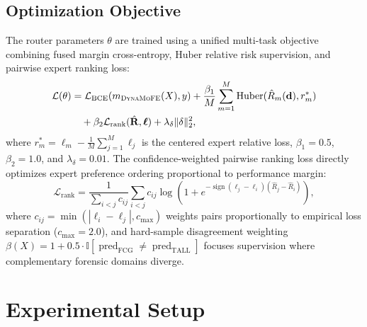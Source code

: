 \documentclass[conference]{IEEEtran}
\newcommand{\dynamofe}{\textsc{DynaMoFE}}
\begin{document}
\subsection{Optimization Objective}
The router parameters $\theta$ are trained using a unified multi-task objective combining fused margin cross-entropy, Huber relative risk supervision, and pairwise expert ranking loss:
\begin{align}
    \mathcal{L}(\theta) &= \mathcal{L}_{\text{BCE}}(m_{\dynamofe}(X), y) + \frac{\beta_1}{M}\sum_{m=1}^M \operatorname{Huber}(\hat{R}_m(\mathbf{d}), r_m^*) \nonumber \\
    &\quad + \beta_2 \mathcal{L}_{\text{rank}}(\hat{\mathbf{R}}, \boldsymbol{\ell}) + \lambda_\delta \|\delta\|_2^2,
\end{align}
where $r_m^* = \ell_m - \frac{1}{M}\sum_{j=1}^M \ell_j$ is the centered expert relative loss, $\beta_1 = 0.5$, $\beta_2 = 1.0$, and $\lambda_\delta = 0.01$. The confidence-weighted pairwise ranking loss directly optimizes expert preference ordering proportional to performance margin:
\begin{equation}
    \mathcal{L}_{\text{rank}} = \frac{1}{\sum_{i < j} c_{ij}}\sum_{i < j} c_{ij} \log\left(1 + e^{-\operatorname{sign}(\ell_j - \ell_i)(\hat{R}_j - \hat{R}_i)}\right),
\end{equation}
where $c_{ij} = \min(|\ell_i - \ell_j|, c_{\max})$ weights pairs proportionally to empirical loss separation ($c_{\max}=2.0$), and hard-sample disagreement weighting $\beta(X) = 1 + 0.5 \cdot \mathbb{I}[\operatorname{pred}_{\text{FCG}} \neq \operatorname{pred}_{\text{TALL}}]$ focuses supervision where complementary forensic domains diverge.

\section{Experimental Setup}
\end{document}
